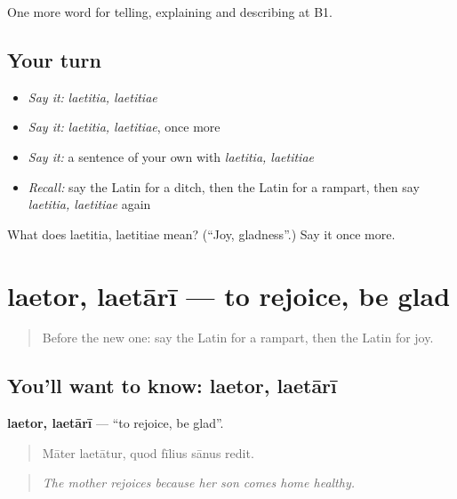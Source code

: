 \begin{grammarlens}[title={What you've built}]
One more word for telling, explaining and describing at B1.
\end{grammarlens}

\subsection*{Your turn}
\begin{itemize}
\raggedright
  \item \emph{Say it:} \emph{laetitia, laetitiae}
  \item \emph{Say it:} \emph{laetitia, laetitiae}, once more
  \item \emph{Say it:} a sentence of your own with \emph{laetitia, laetitiae}
  \item \emph{Recall:} say the Latin for a ditch, then the Latin for a rampart, then say \emph{laetitia, laetitiae} again
\end{itemize}

\begin{tcolorbox}[breakable,colback=teal!4,colframe=teal!35!black,title={Before you move on}]
What does laetitia, laetitiae mean? (\textquotedblleft{}Joy, gladness\textquotedblright{}.) Say it once more.
\end{tcolorbox}
\section[laetor, laetārī]{laetor, laetārī — to rejoice, be glad}

\label{lesson:LA-C489-laetor}



\begin{quote}
Before the new one: say the Latin for a rampart, then the Latin for joy.
\end{quote}

\subsection*{You'll want to know: laetor, laetārī}
\textbf{laetor, laetārī} — \textquotedblleft{}to rejoice, be glad\textquotedblright{}.

\begin{quote}
Māter laetātur, quod fīlius sānus redit.
\end{quote}

\begin{quote}
\emph{The mother rejoices because her son comes home healthy.}
\end{quote}

